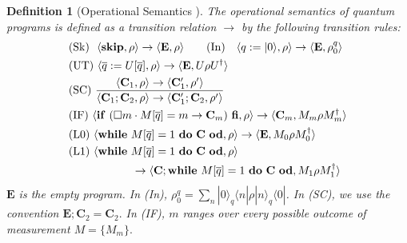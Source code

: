 \documentclass[conference,compsoc, 10pt]{IEEEtran}
\newtheorem{definition}{Definition}[section]
\newcommand {\qbar} {{\overline{q}}}
\newcommand {\qU} {{\overline{q}:=U[\overline{q}]}}
\newcommand {\emptyprog} {{\mathbf{E}}}
\newcommand {\prog } {{\mathbf{C}}}
\begin{document}
	\begin{definition}[Operational Semantics \cite{Ying11}]\label{def-op-sem} The  operational semantics of quantum programs is defined as a transition relation $\rightarrow$ by the following transition rules: %
		\begin{equation*}\begin{split}&({\rm Sk})\ \ \langle\mathbf{skip},\rho\rangle\rightarrow\langle \emptyprog,\rho\rangle\qquad ({\rm In})\ \ \ \langle
		q:=|0\rangle,\rho\rangle\rightarrow\langle \emptyprog,\rho^{q}_0\rangle\\
		&({\rm UT})\ \langle\qU,\rho\rangle\rightarrow\langle
		\emptyprog,U\rho U^{\dag}\rangle\\ 
		&({\rm SC})\ \frac{\langle \prog_1,\rho\rangle\rightarrow\langle
			\prog_1^{\prime},\rho^{\prime}\rangle} {\langle
			\prog_1;\prog_2,\rho\rangle\rightarrow\langle
			\prog_1^{\prime};\prog_2,\rho^\prime\rangle}\\
		&({\rm IF})\ \langle\mathbf{if}\ (\square m\cdot
		M[\qbar]=m\rightarrow \prog_m)\ \mathbf{fi},\rho\rangle\rightarrow\langle
		\prog_m,M_m\rho M_m^{\dag}\rangle\\
		&({\rm L}0)\ \langle\mathbf{while}\
		M[\qbar]=1\ \mathbf{do}\
		\prog\ \mathbf{od},\rho\rangle\rightarrow\langle \emptyprog, M_0\rho M_0^{\dag}\rangle\\
		&({\rm L}1)\ \langle\mathbf{while}\
		M[\qbar]=1\ \mathbf{do}\ \prog\ \mathbf{od},\rho\rangle \\
		&\qquad\qquad\quad\ \ \rightarrow
		\langle \prog;\mathbf{while}\ M[\qbar]=1\ \mathbf{do}\ \prog\ \mathbf{od}, M_1\rho
		M_1^{\dag}\rangle\end{split}\end{equation*}
		$\emptyprog$ is the empty program. In (In), $\rho^{q}_0=\sum_n|0\rangle_q\langle n|\rho|n\rangle_q\langle
		0|$.
		In (SC), we use the convention $\emptyprog;\prog_2=\prog_2.$
		In (IF), $m$ ranges over every possible outcome of measurement $M=\{M_m\}.$

\end{definition}
\end{document}
